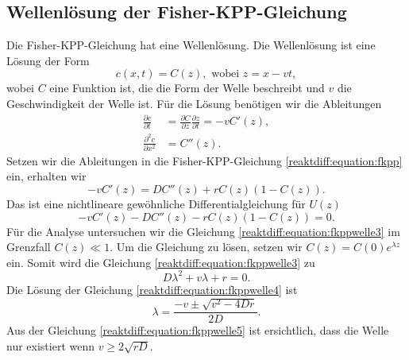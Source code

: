 \subsection{Wellenlösung der Fisher-KPP-Gleichung
\label{reaktdiff:subsection:fkppwelle}}
Die Fisher-KPP-Gleichung hat eine Wellenlösung.
Die Wellenlösung ist eine Lösung der Form
\begin{equation}
\label{reaktdiff:equation:fkppwelle}
c(x,t) = C(z), \text{ wobei } z = x - vt,
\end{equation}
wobei \(C\) eine Funktion ist, die die Form der Welle beschreibt und \(v\) die Geschwindigkeit der Welle ist.
Für die Lösung benötigen wir die Ableitungen
\begin{align*}
\frac{\partial c}{\partial t} &= \frac{\partial C}{\partial z}\frac{\partial z}{\partial t} = -vC'(z),
\\
\frac{\partial^2 c}{\partial x^2} &= C''(z).
\end{align*}
Setzen wir die Ableitungen in die Fisher-KPP-Gleichung \ref{reaktdiff:equation:fkpp} ein, erhalten wir
\begin{equation}
\label{reaktdiff:equation:fkppwelle2}
-vC'(z) = D C''(z) + rC(z)(1-C(z)).
\end{equation}
Das ist eine nichtlineare gewöhnliche Differentialgleichung für \(U(z)\)
\begin{equation}
    \label{reaktdiff:equation:fkppwelle3}
    -vC'(z) - D C''(z) - rC(z)(1-C(z)) = 0.
\end{equation}
Für die Analyse untersuchen wir die Gleichung \ref{reaktdiff:equation:fkppwelle3} im Grenzfall \(C(z) \ll 1\).
Um die Gleichung zu lösen, setzen wir \(C(z) = C(0) e^{\lambda z}\) ein.
Somit wird die Gleichung \ref{reaktdiff:equation:fkppwelle3} zu
\begin{equation}
\label{reaktdiff:equation:fkppwelle4}
D\lambda^2 + v\lambda + r = 0.
\end{equation}
Die Lösung der Gleichung \ref{reaktdiff:equation:fkppwelle4} ist
\begin{equation}
\label{reaktdiff:equation:fkppwelle5}
\lambda = \frac{-v \pm \sqrt{v^2 - 4Dr}}{2D}.
\end{equation}
Aus der Gleichung \ref{reaktdiff:equation:fkppwelle5} ist ersichtlich, dass die Welle nur existiert wenn \(v \ge 2\sqrt{rD}\).

